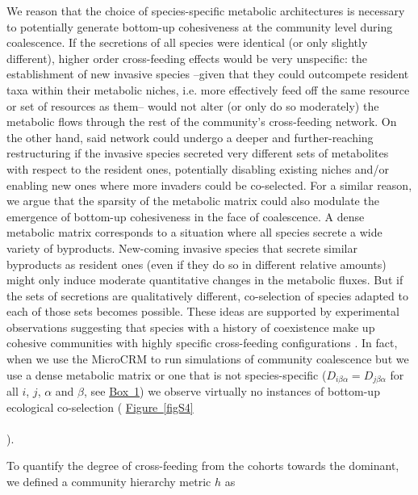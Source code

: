\documentclass[a4paper,10pt]{article}
\newcommand{\figref}[2][]{%
  \hyperref[{#2}]{%
    Figure~\ref*{#2}%
    \ifx\\#1\\%
    \else
      #1%
    \fi
  }%
}
\begin{document}
We reason that the choice of species-specific metabolic architectures is necessary
to potentially generate bottom-up cohesiveness at the community level during coalescence.
If the secretions of all species were identical (or only slightly different),
higher order cross-feeding effects would be very unspecific:
the establishment of new invasive species
--given that they could outcompete resident taxa within their metabolic niches,
i.e. more effectively feed off the same resource or set of resources as them--
would not alter (or only do so moderately)
the metabolic flows through the rest of the community's cross-feeding network.
On the other hand, said network could undergo a deeper and further-reaching restructuring
if the invasive species secreted very different sets of metabolites with respect to the resident ones,
potentially disabling existing niches and/or enabling new ones
where more invaders could be co-selected.
For a similar reason, we argue that the sparsity of the metabolic matrix could also modulate
the emergence of bottom-up cohesiveness in the face of coalescence.
A dense metabolic matrix corresponds to a situation where all species secrete a wide
variety of byproducts.
New-coming invasive species that secrete similar byproducts as resident ones
(even if they do so in different relative amounts)
might only induce moderate quantitative changes in the metabolic fluxes.
But if the sets of secretions are qualitatively different, co-selection of species adapted to
each of those sets becomes possible.
These ideas are supported by experimental observations
suggesting that species with a history of coexistence make up
cohesive communities with highly specific cross-feeding configurations
\cite{Rosenzweig1994,Goldford2018,Estrela2020}.
In fact, when we use the MicroCRM to run simulations of community coalescence
but we use a dense metabolic matrix or one that is not species-specific
($D_{i\beta\alpha}=D_{j\beta\alpha}$ for all $i$, $j$, $\alpha$ and $\beta$,
see \hyperref[box1]{Box~1})
we observe virtually no instances of bottom-up ecological co-selection
(\figref{figS4}).

To quantify the degree of cross-feeding from the cohorts towards the dominant,
we defined a community hierarchy metric $h$ as
\end{document}
